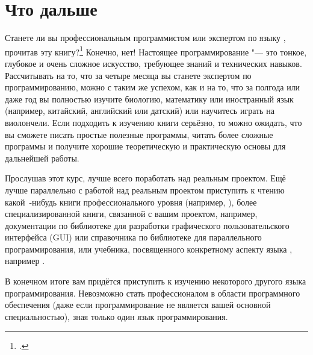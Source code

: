 
\chapter{Что дальше}
Станете ли вы профессиональным программистом или экспертом по языку , прочитав эту книгу?\footcite[Текст взят из подраздела 0.1.3]{Stroustrup:2016:ru} Конечно, нет! Настоящее программирование "--- это тонкое, глубокое и очень сложное искусство, требующее знаний и технических навыков. Рассчитывать на то, что за четыре месяца вы станете экспертом по программированию, можно с таким же успехом, как и на то, что за полгода или даже год вы полностью изучите биологию, математику или иностранный язык (например, китайский, английский или датский) или научитесь играть на виолончели. Если подходить к изучению книги серьёзно, то можно ожидать, что вы сможете писать простые полезные программы, читать более сложные программы и получите хорошие теоретическую и практическую основы для дальнейшей работы.

Прослушав этот курс, лучше всего поработать над реальным проектом. Ещё лучше параллельно с работой над реальным проектом приступить к чтению какой~-нибудь книги профессионального уровня (например, \textcite{Stroustrup:2013:en}), более специализированной книги, связанной с вашим проектом, например, документации по библиотеке  для разработки графического пользовательского интерфейса (GUI) или справочника по библиотеке  для параллельного программирования, или учебника, посвященного конкретному аспекту языка , например \textcite{Koenig:2002:ru, Sutter:2008:ru, Gamma:2004:ru}.

В конечном итоге вам придётся приступить к изучению некоторого другого языка программирования. Невозможно стать профессионалом в области программного обеспечения (даже если программирование не является вашей основной специальностью), зная только один язык программирования.
